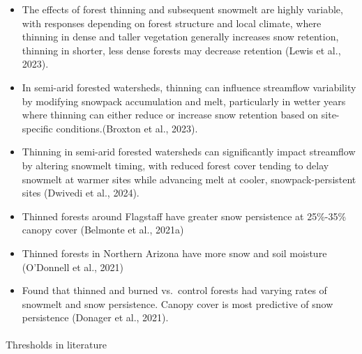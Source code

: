 \documentclass[
]{agujournal2019}
\makeatletter
\let\oldparagraph\paragraph
\renewcommand{\paragraph}{
    \@ifstar
      \xxxParagraphStar
      \xxxParagraphNoStar
  }
\newcommand{\xxxParagraphStar}[1]{\oldparagraph*{#1}\mbox{}}
\newcommand{\xxxParagraphNoStar}[1]{\oldparagraph{#1}\mbox{}}
\makeatother
\begin{document}
\begin{itemize}
\item
  The effects of forest thinning and subsequent snowmelt are highly
  variable, with responses depending on forest structure and local
  climate, where thinning in dense and taller vegetation generally
  increases snow retention, thinning in shorter, less dense forests may
  decrease retention (Lewis et al., 2023).
\item
  In semi-arid forested watersheds, thinning can influence streamflow
  variability by modifying snowpack accumulation and melt, particularly
  in wetter years where thinning can either reduce or increase snow
  retention based on site-specific conditions.(Broxton et al., 2023).
\item
  Thinning in semi-arid forested watersheds can significantly impact
  streamflow by altering snowmelt timing, with reduced forest cover
  tending to delay snowmelt at warmer sites while advancing melt at
  cooler, snowpack-persistent sites (Dwivedi et al., 2024).
\item
  Thinned forests around Flagstaff have greater snow persistence at
  25\%-35\% canopy cover (Belmonte et al., 2021a)
\item
  Thinned forests in Northern Arizona have more snow and soil moisture
  (O'Donnell et al., 2021)
\item
  Found that thinned and burned vs.~control forests had varying rates of
  snowmelt and snow persistence. Canopy cover is most predictive of snow
  persistence (Donager et al., 2021).
\end{itemize}

\paragraph{Thresholds in literature}\label{thresholds-in-literature}
\end{document}

